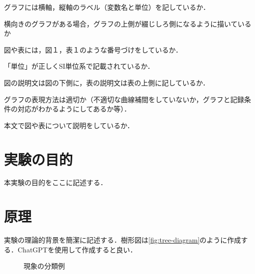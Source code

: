 \documentclass[lualatex,ja=standard]{bxjsarticle}
\begin{document}
\begin{titlepage}
  \begin{description}
    \setlength{\parskip}{0.1cm}
    \setlength{\itemsep}{0.1cm}
    \item[\hspace{0.7cm}\checkmark]  グラフには横軸，縦軸のラベル（変数名と単位）を記しているか．
    \item[\hspace{0.7cm}\checkmark]  横向きのグラフがある場合，グラフの上側が綴じしろ側になるように描いているか
    \item[\hspace{0.7cm}\checkmark]  図や表には，図１，表１のような番号づけをしているか．
    \item[\hspace{0.7cm}\checkmark]  「単位」が正しくSI単位系で記載されているか．
    \item[\hspace{0.7cm}\checkmark]  図の説明文は図の下側に，表の説明文は表の上側に記しているか．
    \item[\hspace{0.7cm}\checkmark]  グラフの表現方法は適切か（不適切な曲線補間をしていないか，グラフと記録条件の対応がわかるようにしてあるか等）．
    \item[\hspace{0.7cm}\checkmark]  本文で図や表について説明をしているか．
  \end{description}
\end{titlepage}

\section{実験の目的}
本実験の目的をここに記述する．

\section{原理}
実験の理論的背景を簡潔に記述する．樹形図は\autoref{fig:tree-diagram}のように作成する．ChatGPTを使用して作成すると良い．

\begin{figure}[htbp]
  \centering
  \caption{現象の分類例}
  \label{fig:tree-diagram}
\end{figure}
\end{document}
